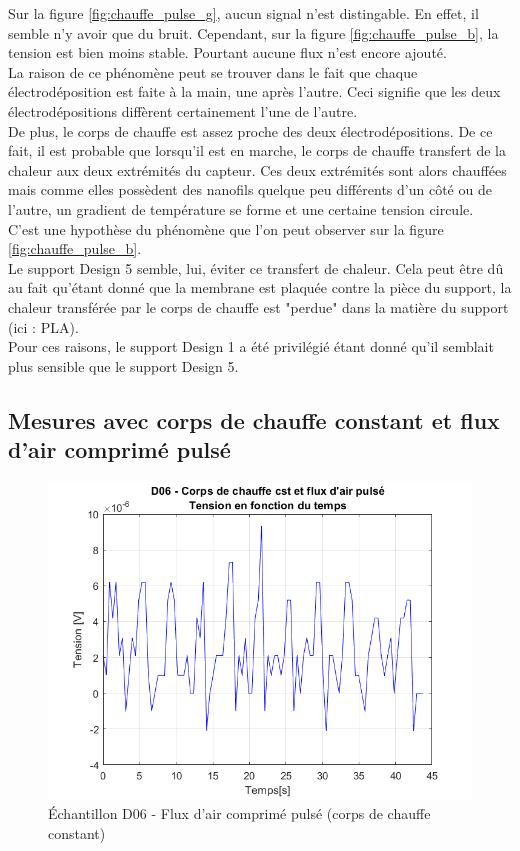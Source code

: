 Sur la figure \ref*{fig:chauffe_pulse_g}, aucun signal n'est distingable. En effet, il semble n'y avoir que du bruit. Cependant, sur la figure
\ref*{fig:chauffe_pulse_b}, la tension est bien moins stable. Pourtant aucune flux n'est encore ajouté. \\

La raison de ce phénomène peut se trouver dans le fait que chaque électrodéposition est faite à la main, une après l'autre. Ceci signifie que
les deux électrodépositions diffèrent certainement l'une de l'autre. \\
De plus, le corps de chauffe est assez proche des deux électrodépositions. De ce fait, il est probable que lorsqu'il est en marche, le corps de
chauffe transfert de la chaleur aux deux extrémités du capteur. Ces deux extrémités sont alors chauffées mais comme elles possèdent des nanofils
quelque peu différents d'un côté ou de l'autre, un gradient de température se forme et une certaine tension circule. \\
C'est une hypothèse du phénomène que l'on peut observer sur la figure \ref*{fig:chauffe_pulse_b}.\\

Le support Design 5 semble, lui, éviter ce transfert de chaleur. Cela peut être dû au fait qu'étant donné que la membrane est plaquée contre
la pièce du support, la chaleur transférée par le corps de chauffe est "perdue" dans la matière du support (ici : PLA).\\

Pour ces raisons, le support Design 1 a été privilégié étant donné qu'il semblait plus sensible que le support Design 5.\\

\subsection{Mesures avec corps de chauffe constant et flux d'air comprimé pulsé}
\begin{figure}[H]
    \centering
    \includegraphics[scale = 0.5]{assets/figures/D06_air_comprime_pulse.png}
    \caption{Échantillon D06 - Flux d'air comprimé pulsé (corps de chauffe constant)}
    \label{fig:D06_airPulse}
\end{figure}

